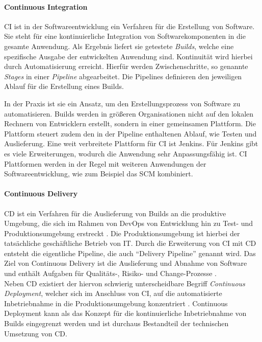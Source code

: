 \paragraph{Continuous Integration}
\ac{CI} ist in der Softwareentwicklung ein Verfahren für die Erstellung von Software. Sie steht für eine kontinuierliche Integration von Softwarekomponenten in die gesamte Anwendung. Als Ergebnis liefert sie getestete \emph{Builds}, welche eine spezifische Ausgabe der entwickelten Anwendung sind. Kontinuität wird hierbei durch Automatisierung erreicht. Hierfür werden Zwischenschritte, so genannte \emph{Stages} in einer \emph{Pipeline} abgearbeitet. Die Pipelines definieren den jeweiligen Ablauf für die Erstellung eines Builds.

In der Praxis ist sie ein Ansatz, um den Erstellungsprozess von Software zu automatisieren. Builds werden in größeren Organisationen nicht auf den lokalen Rechnern von Entwicklern erstellt, sondern in einer gemeinsamen Plattform. Die Plattform steuert zudem den in der Pipeline enthaltenen Ablauf, wie Testen und Auslieferung. Eine weit verbreitete Plattform für \ac{CI} ist Jenkins. Für Jenkins gibt es viele Erweiterungen, wodurch die Anwendung sehr Anpassungsfähig ist. 
\ac{CI} Plattformen werden in der Regel mit weiteren Anwendungen der Softwareentwicklung, wie zum Beispiel das \ac{SCM} kombiniert. 

\paragraph{Continuous Delivery}
\ac{CD} ist ein Verfahren für die Auslieferung von Builds an die produktive Umgebung, die sich im Rahmen von DevOps von Entwicklung hin zu Test- und Produktionsumgebung erstreckt \citet{Alt2017}. Die Produktionsumgebung ist hierbei der tatsächliche geschäftliche Betrieb von IT. Durch die Erweiterung von \ac{CI} mit \ac{CD} entsteht die eigentliche Pipeline, die auch \enquote{Delivery Pipeline} genannt wird. Das Ziel von Continuous Delivery ist die Auslieferung und Abnahme von Software und enthält Aufgaben für Qualitäts-, Risiko- und Change-Prozesse \cite{Alt2017}.
\medskip
\\
Neben \ac{CD} existiert der hiervon schwierig unterscheidbare Begriff \emph{Continuous Deployment}, welcher sich im Anschluss von \ac{CI}, auf die automatisierte Inbetriebnahme in die Produktionsumgebung konzentriert \cite{Alt2017}. Continuous Deployment kann als das Konzept für die kontinuierliche Inbetriebnahme von Builds eingegrenzt werden und ist durchaus Bestandteil der technischen Umsetzung von \ac{CD}.
%
